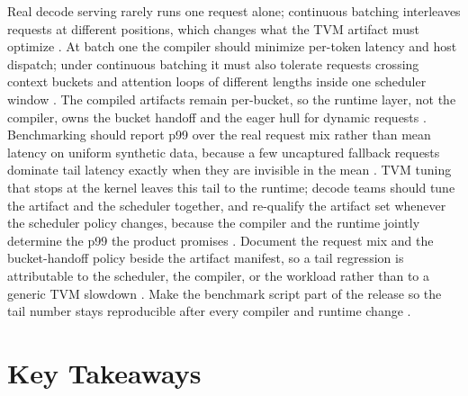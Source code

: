 Real decode serving rarely runs one request alone; continuous batching interleaves requests at different positions, which changes what the TVM artifact must optimize \citep{kwon2023vllm,patel2025llminference}. At batch one the compiler should minimize per-token latency and host dispatch; under continuous batching it must also tolerate requests crossing context buckets and attention loops of different lengths inside one scheduler window \citep{taxbreak2026,memoryfloor2026}. The compiled artifacts remain per-bucket, so the runtime layer, not the compiler, owns the bucket handoff and the eager hull for dynamic requests \citep{nvidia2024cudagraphs,chen2018tvm}. Benchmarking should report p99 over the real request mix rather than mean latency on uniform synthetic data, because a few uncaptured fallback requests dominate tail latency exactly when they are invisible in the mean \citep{patel2025llminference,kwon2023vllm}. TVM tuning that stops at the kernel leaves this tail to the runtime; decode teams should tune the artifact and the scheduler together, and re-qualify the artifact set whenever the scheduler policy changes, because the compiler and the runtime jointly determine the p99 the product promises \citep{memoryfloor2026,patel2025llminference}. Document the request mix and the bucket-handoff policy beside the artifact manifest, so a tail regression is attributable to the scheduler, the compiler, or the workload rather than to a generic TVM slowdown \citep{kwon2023vllm,patel2025llminference}. Make the benchmark script part of the release so the tail number stays reproducible after every compiler and runtime change \citep{memoryfloor2026,taxbreak2026}.

\section{Key Takeaways}
\label{sec:ch16_key_takeaways}

